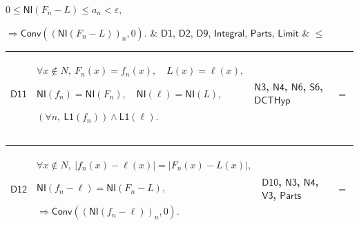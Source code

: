 \documentclass[11pt]{amsart}
\newlength{\FTCFourColumnBody}
\begin{document}
{\begin{tabular}
$\displaystyle 0\le\textsf{NI}(F_n-L)\le a_n<\varepsilon,$\par
$\displaystyle \Rightarrow\textsf{Conv}((\textsf{NI}(F_n-L))_n,0).$ & \hyperlink{dct:D1}{$\displaystyle \textsf{D1}$}, \hyperlink{dct:D2}{$\displaystyle \textsf{D2}$}, \hyperlink{dct:D9}{$\displaystyle \textsf{D9}$}, \hyperlink{lem:Integral}{$\displaystyle \textsf{Integral}$}, \hyperlink{dctdef:Parts}{$\displaystyle \textsf{Parts}$}, \hyperlink{def:Limit}{$\displaystyle \textsf{Limit}$} & $\displaystyle \le$\\ \hline
\end{tabular}%
\par\setlength{\parskip}{0pt}\nointerlineskip
\noindent
\begin{tabular}{|@{}>{\centering\arraybackslash}m{0.078431\FTCFourColumnBody}|>{\centering\arraybackslash}m{0.535947\FTCFourColumnBody}|>{\centering\arraybackslash}m{0.281045\FTCFourColumnBody}|>{\centering\arraybackslash}m{0.104575\FTCFourColumnBody}|}\hline
\hypertarget{dct:D11}{$\displaystyle \textsf{D11}$} & $\displaystyle \forall x\notin N,\ F_n(x)=f_n(x),\quad L(x)=\ell(x),$\par
$\displaystyle \textsf{NI}(f_n)=\textsf{NI}(F_n),\quad\textsf{NI}(\ell)=\textsf{NI}(L),$\par
$\displaystyle (\forall n,\ \textsf{L1}(f_n))\land\textsf{L1}(\ell).$ & \hyperlink{dct:N3}{$\displaystyle \textsf{N3}$}, \hyperlink{dct:N4}{$\displaystyle \textsf{N4}$}, \hyperlink{dct:N6}{$\displaystyle \textsf{N6}$}, \hyperlink{dct:S6}{$\displaystyle \textsf{S6}$}, \hyperlink{dctdef:DCTHyp}{$\displaystyle \textsf{DCTHyp}$} & $\displaystyle =$\\ \hline
\end{tabular}%
\par\setlength{\parskip}{0pt}\nointerlineskip
\noindent
\begin{tabular}{|@{}>{\centering\arraybackslash}m{0.078431\FTCFourColumnBody}|>{\centering\arraybackslash}m{0.535947\FTCFourColumnBody}|>{\centering\arraybackslash}m{0.281045\FTCFourColumnBody}|>{\centering\arraybackslash}m{0.104575\FTCFourColumnBody}|}\hline
\hypertarget{dct:D12}{$\displaystyle \textsf{D12}$} & $\displaystyle \forall x\notin N,\ |f_n(x)-\ell(x)|=|F_n(x)-L(x)|,$\par
$\displaystyle \textsf{NI}(f_n-\ell)=\textsf{NI}(F_n-L),$\par
$\displaystyle \Rightarrow\textsf{Conv}((\textsf{NI}(f_n-\ell))_n,0).$ & \hyperlink{dct:D10}{$\displaystyle \textsf{D10}$}, \hyperlink{dct:N3}{$\displaystyle \textsf{N3}$}, \hyperlink{dct:N4}{$\displaystyle \textsf{N4}$}, \hyperlink{dct:V3}{$\displaystyle \textsf{V3}$}, \hyperlink{dctdef:Parts}{$\displaystyle \textsf{Parts}$} & $\displaystyle =$\\ \hline

\end{tabular}}
\end{document}
